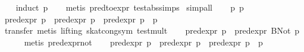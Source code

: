 \begin{isabellebody}
%
\isadelimproof
\ \ %
\endisadelimproof
%
\isatagproof
{}\isamarkupfalse%
\ {}induct\ p{}\isanewline
\ \ \isamarkupfalse%
\ {}metis\ pred{}to{}expr\ test{}abs{}simps{}{}{}{}\isanewline
{}\isamarkupfalse%
\ simp{}all\isanewline
\ \ \isamarkupfalse%
\ p{}\ p{}\isanewline
\ \ \isamarkupfalse%
\ {}pred{}expr\ p{}\ {}\ pred{}expr\ p{}\ {}\ pred{}expr\ {}p{}\ {}{}{}\ p{}{}{}\isanewline
\ \ \ \ \isamarkupfalse%
\ {}transfer{}\ metis\ {}lifting{}\ skat{}cong{}sym\ test{}mult{}\isanewline
\ \ \isamarkupfalse%
\ {}{}{}pred{}expr\ p{}{}\ {}\ pred{}expr\ {}BNot\ p{}{}{}\isanewline
\ \ \ \ \isamarkupfalse%
\ {}metis\ pred{}expr{}not{}\isanewline
\ \ \isamarkupfalse%
\ {}pred{}expr\ p{}\ {}\ pred{}expr\ p{}\ {}\ pred{}expr\ {}p{}\ {}{}{}\ p{}{}{}\isanewline

\end{isabellebody}
